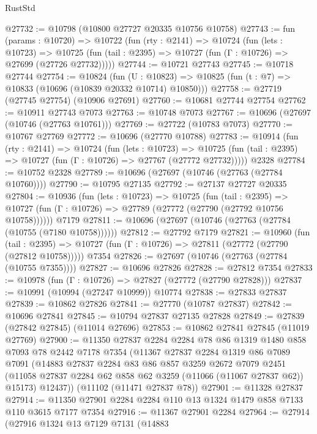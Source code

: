 \begin{lexlean}{RustStd}
\begin{coremodule}
@27732 := @10798 (@10800 @27727 @20335 @10756 @10758)
@27743 := fun (params : @10720) =>
  @10722
    (fun (rty : @2141) =>
    @10724
      (fun (lets : @10723) =>
      @10725 (fun (tail : @2395) => @10727 (fun (Γ : @10726) => @27699 (@27726 @27732)))))
@27744 := @10721 @27743
@27745 := @10718 @27744
@27754 := @10824
    (fun (U : @10823) => @10825 (fun (t : @7) => @10833 (@10696 (@10839 @20332 @10714) @10850)))
@27758 := @27719 (@27745 @27754) (@10906 @27691)
@27760 := @10681 @27744 @27754
@27762 := @10911 @27743 @7073
@27763 := @10748 @7073
@27767 := @10696 (@27697 (@10746 (@27763 @10761)))
@27769 := @27722 (@10783 @7073)
@27770 := @10767 @27769
@27772 := @10696 (@27770 @10788)
@27783 := @10914
    (fun (rty : @2141) =>
    @10724
      (fun (lets : @10723) =>
      @10725 (fun (tail : @2395) => @10727 (fun (Γ : @10726) => @27767 (@27772 @27732)))))
    @2328
@27784 := @10752 @2328
@27789 := @10696 (@27697 (@10746 (@27763 (@27784 @10760))))
@27790 := @10795 @27135
@27792 := @27137 @27727 @20335
@27804 := @10936
    (fun (lets : @10723) =>
    @10725
      (fun (tail : @2395) =>
      @10727 (fun (Γ : @10726) => @27789 (@27772 (@27790 (@27792 @10756 @10758))))))
    @7179
@27811 := @10696 (@27697 (@10746 (@27763 (@27784 (@10755 (@7180 @10758))))))
@27812 := @27792 @7179
@27821 := @10960
    (fun (tail : @2395) => @10727 (fun (Γ : @10726) => @27811 (@27772 (@27790 (@27812 @10758)))))
    @7354
@27826 := @27697 (@10746 (@27763 (@27784 (@10755 @7355))))
@27827 := @10696 @27826
@27828 := @27812 @7354
@27833 := @10978 (fun (Γ : @10726) => @27827 (@27772 (@27790 @27828)))
@27837 := @10991 (@10994 (@27247 @10999)) @10774
@27838 := @27833 @27837
@27839 := @10862 @27826
@27841 := @27770 (@10787 @27837)
@27842 := @10696 @27841
@27845 := @10794 @27837 @27135 @27828
@27849 := @27839 (@27842 @27845) (@11014 @27696)
@27853 := @10862 @27841 @27845 (@11019 @27769)
@27900 := @11350
    @27837
    @2284
    @2284
    @78
    @86
    @1319
    @1480
    @858
    @7093
    @78
    @2442
    @7178
    @7354
    (@11367
      @27837
      @2284
      @1319
      @86
      @7089
      @7091
      (@14883
        @27837
        @2284
        @83
        @86
        @857
        @3259
        @2672
        @7079
        @2451
        (@11058 @27837 @2284 @62 @858 @62 @3259 (@11066 (@11067 @27837 @62)) @15173)
        @12437))
    (@11102 (@11471 @27837 @78))
@27901 := @11328 @27837
@27914 := @11350 @27901 @2284 @2284 @110 @13 @1324 @1479 @858 @7133 @110 @3615 @7177 @7354
@27916 := @11367 @27901 @2284
@27964 := @27914
    (@27916
      @1324
      @13
      @7129
      @7131
      (@14883

\end{coremodule}
\end{lexlean}
